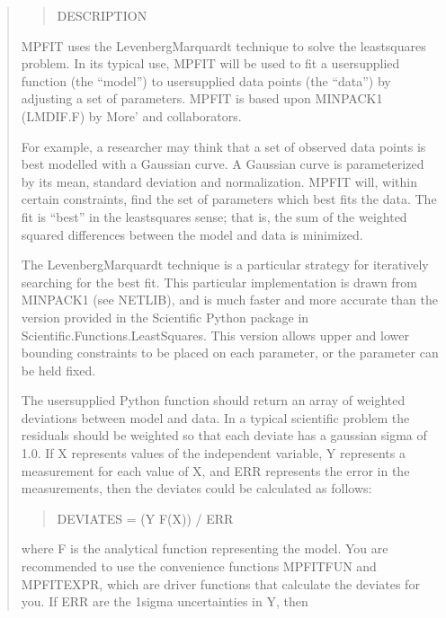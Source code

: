 \documentclass[letterpaper,10pt,english]{sphinxmanual}
\begin{document}
\begin{quote}
\begin{description}
\begin{quote}
DESCRIPTION
\end{quote}

\end{description}

MPFIT uses the Levenberg\sphinxhyphen{}Marquardt technique to solve the
least\sphinxhyphen{}squares problem.  In its typical use, MPFIT will be used to
fit a user\sphinxhyphen{}supplied function (the “model”) to user\sphinxhyphen{}supplied data
points (the “data”) by adjusting a set of parameters.  MPFIT is
based upon MINPACK\sphinxhyphen{}1 (LMDIF.F) by More’ and collaborators.

For example, a researcher may think that a set of observed data
points is best modelled with a Gaussian curve.  A Gaussian curve is
parameterized by its mean, standard deviation and normalization.
MPFIT will, within certain constraints, find the set of parameters
which best fits the data.  The fit is “best” in the least\sphinxhyphen{}squares
sense; that is, the sum of the weighted squared differences between
the model and data is minimized.

The Levenberg\sphinxhyphen{}Marquardt technique is a particular strategy for
iteratively searching for the best fit.  This particular
implementation is drawn from MINPACK\sphinxhyphen{}1 (see NETLIB), and is much faster
and more accurate than the version provided in the Scientific Python package
in Scientific.Functions.LeastSquares.
This version allows upper and lower bounding constraints to be placed on each
parameter, or the parameter can be held fixed.

The user\sphinxhyphen{}supplied Python function should return an array of weighted
deviations between model and data.  In a typical scientific problem
the residuals should be weighted so that each deviate has a
gaussian sigma of 1.0.  If X represents values of the independent
variable, Y represents a measurement for each value of X, and ERR
represents the error in the measurements, then the deviates could
be calculated as follows:
\begin{quote}

DEVIATES = (Y \sphinxhyphen{} F(X)) / ERR
\end{quote}

where F is the analytical function representing the model.  You are
recommended to use the convenience functions MPFITFUN and
MPFITEXPR, which are driver functions that calculate the deviates
for you.  If ERR are the 1\sphinxhyphen{}sigma uncertainties in Y, then
\begin{quote}


\end{quote}
\end{quote}
\end{document}
